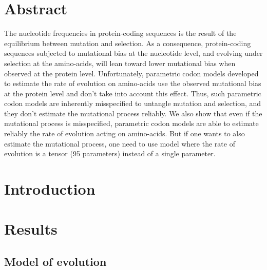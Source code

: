\section{Abstract}

The nucleotide frequencies in protein-coding sequences is the result of the equilibrium between mutation and selection.
As a consequence, protein-coding sequences subjected to mutational bias at the nucleotide level, and evolving under selection at the amino-acids, will lean toward lower mutational bias when observed at the protein level.
Unfortunately, parametric \gls{codon} models developed to estimate the rate of evolution on amino-acids use the observed mutational bias at the protein level and don't take into account this effect.
Thus, such parametric \gls{codon} models are inherently misspecified to untangle mutation and selection, and they don’t estimate the mutational process reliably.
We also show that even if the mutational process is misspecified, parametric \gls{codon} models are able to estimate reliably the rate of evolution acting on amino-acids.
But if one wants to also estimate the mutational process, one need to use model where the rate of evolution is a tensor (95 parameters) instead of a single parameter.


\section{Introduction}


\section{Results}

\subsection{Model of evolution}

